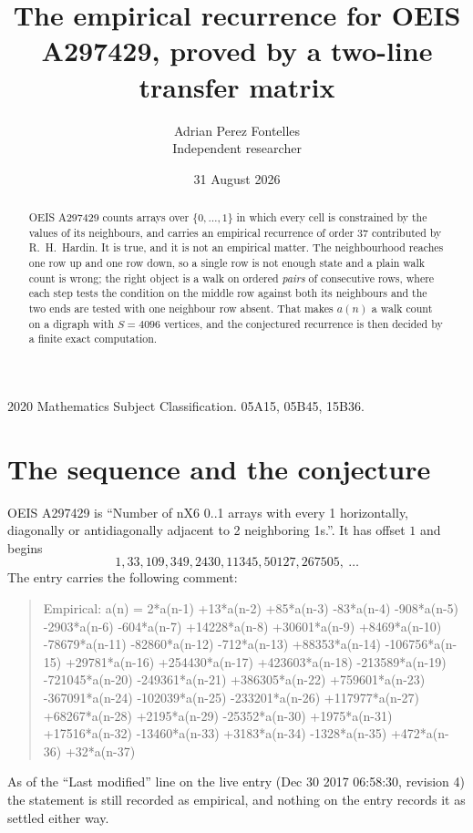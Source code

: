 \documentclass[11pt,a4paper]{article}
\title{The empirical recurrence for OEIS A297429, proved by a two-line transfer matrix}
\author{Adrian Perez Fontelles\\ \small Independent researcher}
\date{31 August 2026}
\theoremstyle{plain}
\theoremstyle{definition}
\begin{document}
\maketitle

\begin{abstract}
OEIS A297429 counts arrays over $\{0,\dots,1\}$ in which every cell is constrained by the
values of its neighbours, and carries an empirical recurrence of order $37$ contributed
by R.~H.~Hardin. It is true, and it is not an empirical matter. The neighbourhood reaches one
row up and one row down, so a single row is not enough state and a plain walk count
is wrong; the right object is a walk on ordered \emph{pairs} of consecutive rows, where
each step tests the condition on the middle row against both its neighbours and the two
ends are tested with one neighbour row absent. That makes $a(n)$ a walk count on a digraph
with $S=4096$ vertices, and the conjectured recurrence is then decided by a finite exact
computation.
\end{abstract}

\noindent\small 2020 Mathematics Subject Classification. 05A15, 05B45, 15B36.\normalsize

\section{The sequence and the conjecture}

OEIS A297429 is ``Number of nX6 0..1 arrays with every 1 horizontally, diagonally or antidiagonally adjacent to 2 neighboring 1s.''. It has offset $1$ and begins
\[
1, 33, 109, 349, 2430, 11345, 50127, 267505,\ \dots
\]
The entry carries the following comment:
\begin{quote}\small
Empirical: a(n) = 2*a(n-1) +13*a(n-2) +85*a(n-3) -83*a(n-4) -908*a(n-5) -2903*a(n-6) -604*a(n-7) +14228*a(n-8) +30601*a(n-9) +8469*a(n-10) -78679*a(n-11) -82860*a(n-12) -712*a(n-13) +88353*a(n-14) -106756*a(n-15) +29781*a(n-16) +254430*a(n-17) +423603*a(n-18) -213589*a(n-19) -721045*a(n-20) -249361*a(n-21) +386305*a(n-22) +759601*a(n-23) -367091*a(n-24) -102039*a(n-25) -233201*a(n-26) +117977*a(n-27) +68267*a(n-28) +2195*a(n-29) -25352*a(n-30) +1975*a(n-31) +17516*a(n-32) -13460*a(n-33) +3183*a(n-34) -1328*a(n-35) +472*a(n-36) +32*a(n-37)
\end{quote}
As of the ``Last modified'' line on the live entry (Dec 30 2017 06:58:30, revision 4) the statement is
still recorded as empirical, and nothing on the entry records it as settled either way.
\end{document}
